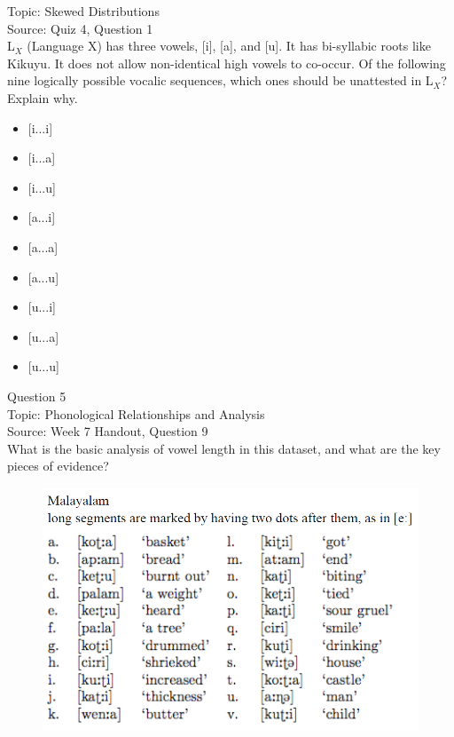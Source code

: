\documentclass[12pt]{article}
\begin{document}
Topic: Skewed Distributions\\
Source: Quiz 4, Question 1\\

L$_X$ (Language X) has three vowels, [i], [a], and [u]. It has bi-syllabic roots like Kikuyu. It does not allow non-identical high vowels to co-occur. Of the following nine logically possible vocalic sequences, which ones should be unattested in L$_X$? Explain why.\\

\begin{itemize} \item {[i...i]} \item {[i...a]} \item {[i...u]} \item {[a...i]} \item {[a...a]} \item {[a...u]} \item {[u...i]} \item {[u...a]} \item {[u...u]} \end{itemize}


\newpage

{\large Question 5}\\

Topic: Phonological Relationships and Analysis\\
Source: Week 7 Handout, Question 9\\

What is the basic analysis of vowel length in this dataset, and what are the key pieces of evidence?\\

\begin{figure}[H]
\includegraphics{../images/malayalam.png}
\end{figure}
\end{document}
